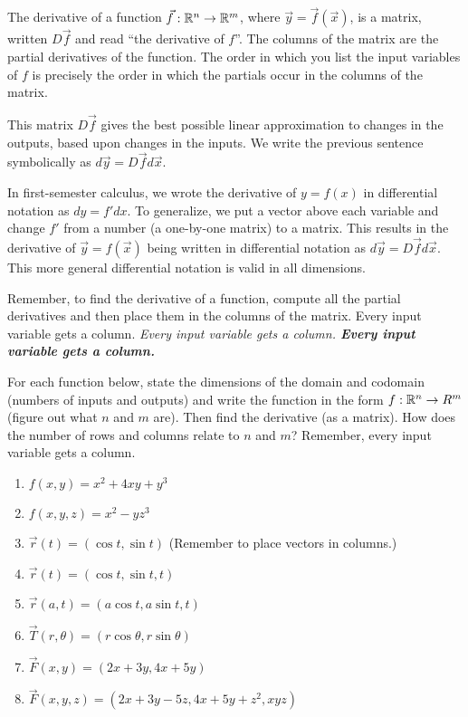 \begin{definition}
The derivative of a function $\vec f:\mathbb{R}^n\to \mathbb{R}^m$, where $\vec y=\vec f(\vec x)$, is a matrix, written $D\vec f$ and read ``the derivative of $f$''. The columns of the matrix are the partial derivatives of the function. The order in which you list the input variables of $f$ is precisely the order in which the partials occur in the columns of the matrix.

 This matrix $D\vec f$ gives the best possible linear approximation to changes in the outputs, based upon changes in the inputs. We write the previous sentence symbolically as $d\vec y = D\vec f d\vec x$. 
\end{definition}
In first-semester calculus, we wrote the derivative of $y=f(x)$ in differential notation as $dy=f'dx$.  To generalize, we put a vector above each variable and change $f'$ from a number (a one-by-one matrix) to a matrix. This results in the derivative of $\vec y=f(\vec x)$ being written in differential notation as $d\vec y = D\vec f d\vec x$.  This more general differential notation is valid in all dimensions.

Remember, to find the derivative of a function, compute all the partial derivatives and then place them in the columns of the matrix. Every input variable gets a column. {\it Every input variable gets a column. {\bf Every input variable gets a column.}} 

\begin{problem}
 For each function below, state the dimensions of the domain and codomain (numbers of inputs and outputs) and write the function in the form $f:\mathbb{R}^n\to R^m$ (figure out what $n$ and $m$ are).  Then find the derivative (as a matrix). How does the number of rows and columns relate to $n$ and $m$? Remember, every input variable gets a column. 
\begin{enumerate}
 \item $f(x,y)=x^2+4xy+y^3$
 \item $f(x,y,z)=x^2-yz^3$
 \item $\vec r(t)=(\cos t, \sin t)$ (Remember to place vectors in columns.)
 \item $\vec r(t)=(\cos t, \sin t,t)$
 \item $\vec r(a,t)=(a\cos t, a\sin t,t)$
 \item $\vec T(r,\theta)=(r\cos \theta, r\sin \theta)$
 \item $\vec F(x,y)=(2x+3y,4x+5y)$
 \item $\vec F(x,y,z)=(2x+3y-5z,4x+5y+z^2, xyz)$
\end{enumerate}
\end{problem}

